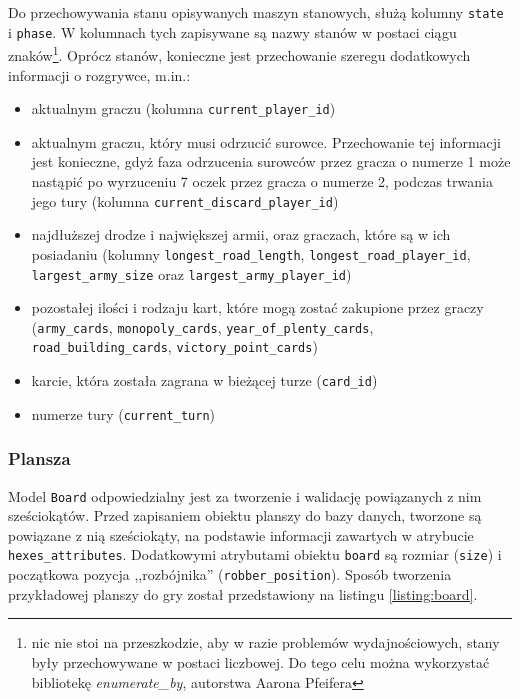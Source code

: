 \documentclass[a4paper,12pt]{article}
\begin{document}
Do przechowywania stanu opisywanych maszyn stanowych, służą kolumny
\texttt{state} i \texttt{phase}. W kolumnach tych zapisywane są nazwy
stanów w postaci ciągu znaków\footnote{nic nie stoi na przeszkodzie,
  aby w razie problemów wydajnościowych, stany były przechowywane w
  postaci liczbowej. Do tego celu można wykorzystać bibliotekę
  \emph{enumerate\_by}, autorstwa Aarona Pfeifera}. Oprócz
stanów, konieczne jest przechowanie szeregu dodatkowych informacji o
rozgrywce, m.in.:

\begin{itemize}
\item aktualnym graczu (kolumna \texttt{current\_player\_id})
\item aktualnym graczu, który musi odrzucić surowce. Przechowanie tej
  informacji jest konieczne, gdyż faza odrzucenia surowców przez
  gracza o numerze 1 może nastąpić po wyrzuceniu 7 oczek przez gracza
  o numerze 2, podczas trwania jego tury (kolumna
  \texttt{current\_discard\_player\_id})
\item najdłuższej drodze i największej armii, oraz graczach, które są
  w ich posiadaniu (kolumny \texttt{longest\_road\_length},
  \texttt{longest\_road\_player\_id}, \texttt{largest\_army\_size}
  oraz \texttt{largest\_army\_player\_id})
\item pozostałej ilości i rodzaju kart, które mogą zostać zakupione
  przez graczy (\texttt{army\_cards}, \texttt{monopoly\_cards},
  \texttt{year\_of\_plenty\_cards}, \texttt{road\_building\_cards},
  \texttt{victory\_point\_cards})
\item karcie, która została zagrana w bieżącej turze (\texttt{card\_id})
\item numerze tury (\texttt{current\_turn})
\end{itemize}

\subsubsection{Plansza}

Model \texttt{Board} odpowiedzialny jest za tworzenie i walidację
powiązanych z nim sześciokątów. Przed zapisaniem obiektu planszy do
bazy danych, tworzone są powiązane z nią sześciokąty, na podstawie
informacji zawartych w atrybucie
\texttt{hexes\_attributes}. Dodatkowymi atrybutami obiektu
\texttt{board} są rozmiar (\texttt{size}) i początkowa pozycja
,,rozbójnika'' (\texttt{robber\_position}). Sposób tworzenia
przykładowej planszy do gry został przedstawiony na listingu
\ref{listing:board}.
\end{document}
